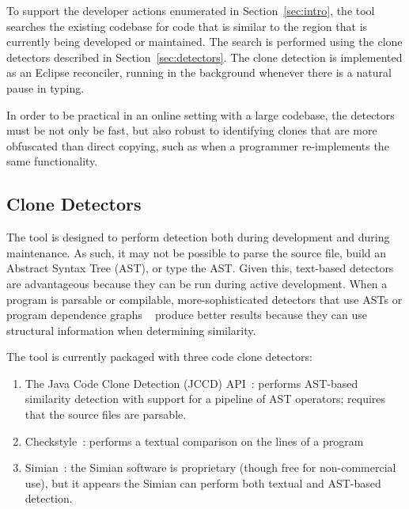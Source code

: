 \documentclass[nocopyrightspace,10pt]{sigplanconf}
\begin{document}


To support the developer actions enumerated in Section~\ref{sec:intro},
the tool searches the existing codebase for code
that is similar to the region that is currently being developed or maintained.
The search is performed using the clone detectors
described in Section~\ref{sec:detectors}. The clone detection is implemented as
an Eclipse reconciler, running in the background whenever there
is a natural pause in typing.

In order to be practical in an online
setting with a large codebase, the detectors must be
not only be fast, but also
robust to identifying clones that are more obfuscated than direct
copying, such as when a programmer re-implements the same
functionality.

\subsection{Clone Detectors}
The tool is designed to perform detection both during development and
during maintenance.  As such, it may not be possible to parse the source
file, build an Abstract Syntax Tree (AST), or type the AST. Given this, text-based detectors
are advantageous because they can be run during active
development. When a program is parsable or compilable,
more-sophisticated detectors that use ASTs or program
dependence graphs ~\cite{LiE2011} produce better results
because they can use structural information when determining
similarity.

\label{sec:detectors}
The tool is currently packaged with three code clone detectors:

\begin{enumerate}
\item The Java Code Clone Detection (JCCD) API~\cite{JCCD}: performs
  AST-based similarity detection with support for a pipeline of AST
  operators; requires that the source files are parsable.
\item Checkstyle~\cite{CheckStyle}: performs a textual comparison on
  the lines of a program
\item Simian~\cite{Simian}: the Simian software is proprietary (though
  free for non-commercial use), but it appears the Simian can perform
  both textual and AST-based detection.
\end{enumerate}
\end{document}
